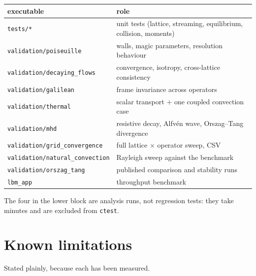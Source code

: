 \documentclass[11pt,a4paper]{article}
\newcommand{\code}[1]{\texttt{\small #1}}
\begin{document}
\begin{center}\small
\begin{tabular}{ll}
\toprule
executable & role \\
\midrule
\code{tests/*}                    & unit tests (lattice, streaming, equilibrium, collision, moments) \\
\code{validation/poiseuille}      & walls, magic parameters, resolution behaviour \\
\code{validation/decaying\_flows} & convergence, isotropy, cross-lattice consistency \\
\code{validation/galilean}        & frame invariance across operators \\
\code{validation/thermal}         & scalar transport $+$ one coupled convection case \\
\code{validation/mhd}             & resistive decay, Alfv\'en wave, Orszag--Tang divergence \\
\midrule
\code{validation/grid\_convergence}   & full lattice $\times$ operator sweep, CSV \\
\code{validation/natural\_convection} & Rayleigh sweep against the benchmark \\
\code{validation/orszag\_tang}        & published comparison and stability runs \\
\code{lbm\_app}                       & throughput benchmark \\
\bottomrule
\end{tabular}
\end{center}

\noindent The four in the lower block are analysis runs, not regression tests:
they take minutes and are excluded from \code{ctest}.

\section{Known limitations}

Stated plainly, because each has been measured.
\end{document}
